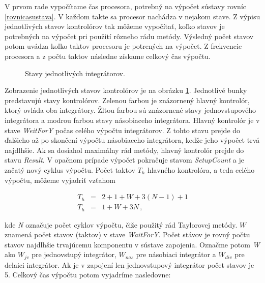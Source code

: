 V prvom rade vypočítame čas procesora, potrebný na výpočet sústavy rovníc \ref{rovnicasustava}. V každom takte sa procesor nachádza v nejakom stave. Z výpisu jednotlivých stavov kontrolórov tak môžeme vypočítať, koľko stavov je potrebných na výpočet pri použití rôzneho rádu metódy. Výsledný počet stavov potom uvádza koľko taktov procesoru je potrených na výpočet. Z frekvencie procesora a z počtu taktov následne získame celkový čas výpočtu.

\bigskip
\begin{figure}[h]
\centering
{}
\caption{Stavy jednotlivých integrátorov.}
\label{stavyimg}
\end{figure}

Zobrazenie jednotlivých stavov kontrolórov je na obrázku \ref{stavyimg}. Jednotlivé bunky predstavujú stavy kontrolórov. Zelenou farbou je znázornený hlavný kontrolór, ktorý ovláda oba integrátory. Žltou farbou sú znázornené stavy jednovstupového integrátora a modrou farbou stavy násobiaceho integrátora. Hlavný kontrolór je v stave \textit{WeitForY} počas celého výpočtu integrátorov. Z tohto stavu prejde do ďalšieho až po skončení výpočtu násobiaceho integrátora, keďže jeho výpočet trvá najdlhšie. Ak sa dosiahol maximálny rád metódy, hlavný kontrolór prejde do stavu \textit{Result}. V opačnom prípade výpočet pokračuje stavom \textit{SetupCount} a je začatý nový cyklus výpočtu. Počet taktov $ T_h $ hlavného kontrolóra, a teda celého výpočtu, môžeme vyjadriť vzťahom

\begin{eqnarray}
T_h & = & 2 + 1 + W + 3(N-1) + 1 \nonumber \\
T_h & = & 1 + W + 3N \, , \label{hkontrolerrovnica}
\end{eqnarray}

kde \textit{N} označuje počet cyklov výpočtu, čiže použitý rád Taylorovej metódy. $ W $ znamená počet stavov (taktov) v stave \textit{WaitForY}. Počet stávov je rovný počtu stavov najdlhšie trvajúcemu komponentu v sústave zapojenia. Označme potom \textit{W} ako $ W_{jv} $ pre jednovstupý integrátor, $ W_{nas} $ pre násobiaci integrátor a $ W_{div} $ pre delaici integrátor.
Ak je v zapojení len jednovstupový integrátor počet stavov je 5. Celkový čas výpočtu potom vyjadríme nasledovne:

